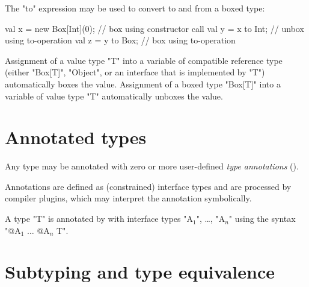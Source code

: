 
The \xcd"to" expression may be used to convert to and from a
boxed type:

\begin{xten}
val x = new Box[Int](0); // box using constructor call
val y = x to Int;        // unbox using to-operation
val z = y to Box;        // box using to-operation
\end{xten}

Assignment of a value type \xcd"T" into a variable of compatible reference type
(either \xcd"Box[T]", \xcd"Object", or an interface that is
implemented by \xcd"T")
automatically boxes the value.  Assignment of a boxed type
\xcd"Box[T]" into
a variable of value type \xcd"T" automatically unboxes the value.



\section{Annotated types}
\label{AnnotatedTypes}


        Any \Xten{} type may be annotated with zero or more
        user-defined \emph{type annotations}
        ().  

        Annotations are defined as (constrained) interface types and are
        processed by compiler plugins, which may interpret the
        annotation symbolically.

        A type \xcd"T" is annotated by with interface types
        \xcdmath"A$_1$", \dots,
        \xcdmath"A$_n$"
        using the syntax
        \xcdmath"@A$_1$ $\dots$ @A$_n$ T".

\section{Subtyping and type equivalence}\label{DepType:Equivalence}

